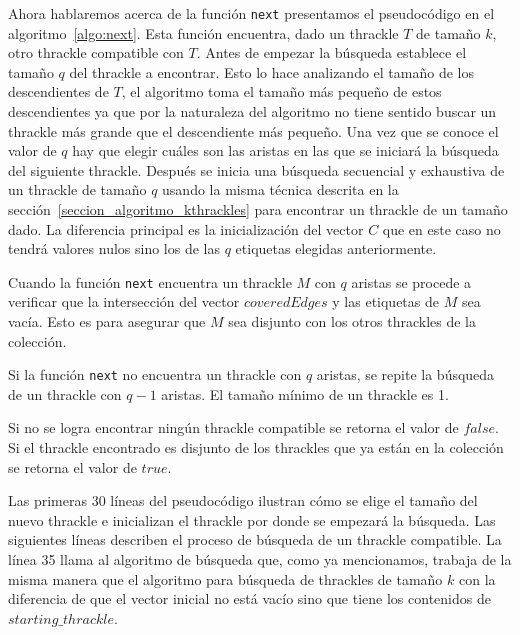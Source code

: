   Ahora hablaremos acerca de la función \texttt{next} presentamos el pseudocódigo en el algoritmo~\ref{algo:next}. Esta función encuentra, dado un thrackle $T$ de tamaño $k$, otro thrackle compatible con $T$. Antes de empezar la búsqueda establece el tamaño $q$ del thrackle a encontrar. Esto lo hace analizando el tamaño de los descendientes de $T$, el algoritmo toma el tamaño más pequeño de estos descendientes ya que por la naturaleza del algoritmo no tiene sentido buscar un thrackle más grande que el descendiente más pequeño. Una vez que se conoce el valor de $q$ hay que elegir cuáles son las aristas en las que se iniciará la búsqueda del siguiente thrackle. Después se inicia una búsqueda secuencial y exhaustiva de un thrackle de tamaño $q$ usando la misma técnica descrita en la sección~\ref{seccion_algoritmo_kthrackles} para encontrar un thrackle de un tamaño dado. La diferencia principal es la inicialización del vector $C$ que en este caso no tendrá valores nulos sino los de las $q$ etiquetas elegidas anteriormente.

  Cuando la función \texttt{next} encuentra un thrackle $M$ con $q$ aristas se procede a verificar
  que la intersección del vector $coveredEdges$ y las etiquetas de $M$ sea vacía. Esto es para asegurar que
  $M$ sea disjunto con los otros thrackles de la colección.

  Si la función \texttt{next} no encuentra un thrackle con $q$ aristas, se repite la búsqueda de un
  thrackle con $q-1$ aristas. El tamaño mínimo de un thrackle es 1.

  Si no se logra encontrar ningún thrackle compatible se retorna el valor de $false$. Si el
  thrackle encontrado es disjunto de los thrackles que ya están en la colección se retorna el valor
  de $true$.

  Las primeras 30 líneas del pseudocódigo ilustran cómo se elige el tamaño del nuevo thrackle e inicializan el thrackle por donde se empezará la búsqueda. Las siguientes líneas describen el proceso de búsqueda de un thrackle compatible. La línea 35 llama al algoritmo de búsqueda que, como ya mencionamos, trabaja de la misma manera que el algoritmo para búsqueda de thrackles de tamaño $k$ con la diferencia de que el vector inicial no está vacío sino que tiene los contenidos de $starting\_thrackle$.

